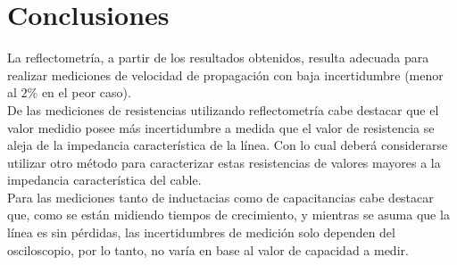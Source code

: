 \documentclass[a4paper,10pt]{article}
\begin{document}
	\section{Conclusiones}
	\indent La reflectometría, a partir de los resultados obtenidos, resulta 
	adecuada para realizar mediciones de velocidad de propagaci\'on con baja 
	incertidumbre (menor al $2 \%$ en el peor caso).\\
	\indent De las mediciones de resistencias utilizando reflectometría cabe 
	destacar que el valor medidio posee más incertidumbre a medida que el 
	valor de resistencia se aleja de la impedancia característica de la línea.
	Con lo cual deber\'a considerarse utilizar otro m\'etodo para caracterizar
	estas resistencias de valores mayores a la impedancia caracter\'istica del
	cable.	\\
	\indent Para las mediciones tanto de inductacias como de capacitancias 
	cabe destacar que, como se están midiendo tiempos de crecimiento, y 
	mientras se	asuma que la línea es sin pérdidas, las incertidumbres de 
	medición solo dependen del osciloscopio, por lo tanto, no varía en base al
	valor de capacidad a medir.\\
\end{document}
